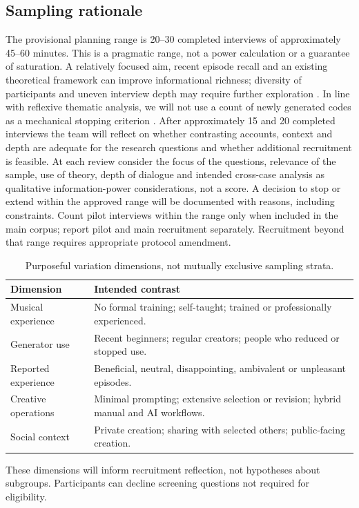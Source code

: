 \subsection{Sampling rationale}
The provisional planning range is 20--30 completed interviews of approximately 45--60 minutes. This is a pragmatic range, not a power calculation or a guarantee of saturation. A relatively focused aim, recent episode recall and an existing theoretical framework can improve informational richness; diversity of participants and uneven interview depth may require further exploration \citep{malterud2016}. In line with reflexive thematic analysis, we will not use a count of newly generated codes as a mechanical stopping criterion \citep{braunsaturation2021}. After approximately 15 and 20 completed interviews the team will reflect on whether contrasting accounts, context and depth are adequate for the research questions and whether additional recruitment is feasible. At each review consider the focus of the questions, relevance of the sample, use of theory, depth of dialogue and intended cross-case analysis as qualitative information-power considerations, not a score. A decision to stop or extend within the approved range will be documented with reasons, including constraints. Count pilot interviews within the range only when included in the main corpus; report pilot and main recruitment separately. Recruitment beyond that range requires appropriate protocol amendment.

\begin{table}[htbp]
\centering\small
\caption{Purposeful variation dimensions, not mutually exclusive sampling strata.}
\label{tab:sampling}
\begin{tabularx}{\linewidth}{@{}p{.30\linewidth}X@{}}
\toprule
Dimension & Intended contrast \\
\midrule
Musical experience & No formal training; self-taught; trained or professionally experienced. \\
Generator use & Recent beginners; regular creators; people who reduced or stopped use. \\
Reported experience & Beneficial, neutral, disappointing, ambivalent or unpleasant episodes. \\
Creative operations & Minimal prompting; extensive selection or revision; hybrid manual and AI workflows. \\
Social context & Private creation; sharing with selected others; public-facing creation. \\
\bottomrule
\end{tabularx}
\end{table}
These dimensions will inform recruitment reflection, not hypotheses about subgroups. Participants can decline screening questions not required for eligibility.

